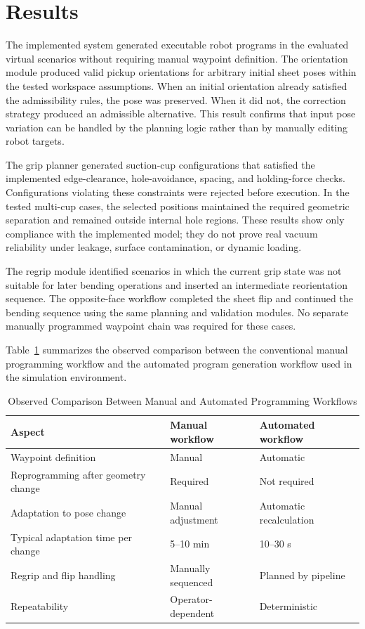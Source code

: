 \documentclass[journal]{IEEEtran}
\begin{document}
\section{Results}
The implemented system generated executable robot programs in the evaluated virtual scenarios without requiring manual waypoint definition. The orientation module produced valid pickup orientations for arbitrary initial sheet poses within the tested workspace assumptions. When an initial orientation already satisfied the admissibility rules, the pose was preserved. When it did not, the correction strategy produced an admissible alternative. This result confirms that input pose variation can be handled by the planning logic rather than by manually editing robot targets.

The grip planner generated suction-cup configurations that satisfied the implemented edge-clearance, hole-avoidance, spacing, and holding-force checks. Configurations violating these constraints were rejected before execution. In the tested multi-cup cases, the selected positions maintained the required geometric separation and remained outside internal hole regions. These results show only compliance with the implemented model; they do not prove real vacuum reliability under leakage, surface contamination, or dynamic loading.

The regrip module identified scenarios in which the current grip state was not suitable for later bending operations and inserted an intermediate reorientation sequence. The opposite-face workflow completed the sheet flip and continued the bending sequence using the same planning and validation modules. No separate manually programmed waypoint chain was required for these cases.

Table~\ref{tab:manual_auto_comparison} summarizes the observed comparison between the conventional manual programming workflow and the automated program generation workflow used in the simulation environment.

\begin{table}[t]
\caption{Observed Comparison Between Manual and Automated Programming Workflows}
\label{tab:manual_auto_comparison}
\centering
\begin{tabular}{p{}p{}p{}}
\toprule
\textbf{Aspect} & \textbf{Manual workflow} & \textbf{Automated workflow} \\
\midrule
Waypoint definition & Manual & Automatic \\
Reprogramming after geometry change & Required & Not required \\
Adaptation to pose change & Manual adjustment & Automatic recalculation \\
Typical adaptation time per change & 5--10 min & 10--30 s \\
Regrip and flip handling & Manually sequenced & Planned by pipeline \\
Repeatability & Operator-dependent & Deterministic \\
\bottomrule
\end{tabular}
\end{table}
\end{document}
